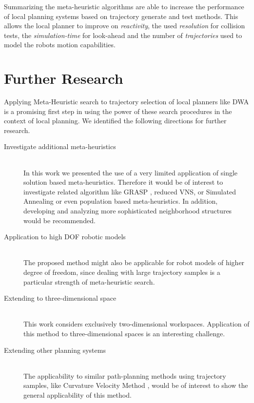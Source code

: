 Summarizing the meta-heuristic algorithms are able to increase the performance of local planning systems based on trajectory generate and test methods. This allows the local planner to improve on \emph{reactivity}, the used \emph{resolution} for collision tests, the \emph{simulation-time} for look-ahead and the number of \emph{trajectories} used to model the robots motion capabilities.

\section{Further Research}
Applying Meta-Heuristic search to trajectory selection of local planners like DWA is a promising first step in using the power of these search procedures in the context of local planning. 
We identified the following directions for further research.

\begin{description}
\item[Investigate additional meta-heuristics]\hfill \\
In this work we presented the use of a very limited application of single solution based meta-heuristics. Therefore it would be of interest to investigate related algorithm like GRASP \cite{feo1995grasp}, reduced VNS, or Simulated Annealing \cite{Kirkpatrick83SimulatedAnnealing} or even population based meta-heuristics.
In addition, developing and analyzing more sophisticated neighborhood structures would be recommended. 

\item[Application to high DOF robotic models]\hfill \\
The proposed method might also be applicable for robot models of higher degree of freedom, since dealing with large trajectory samples is a particular strength of meta-heuristic search.

\item[Extending to three-dimensional space]\hfill \\
This work considers exclusively two-dimensional workspaces. Application of this method to three-dimensional spaces is an interesting challenge. 

\item[Extending other planning systems]\hfill \\
The applicability to similar path-planning methods using trajectory samples, like Curvature Velocity Method \cite{simmons1996curvature}, would be of interest to show the general applicability of this method. 

\end{description}
